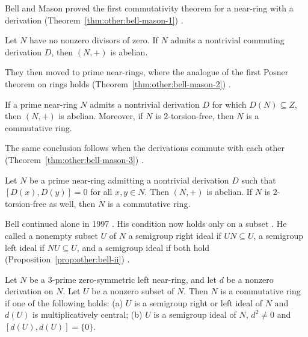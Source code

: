 Bell and Mason proved the first commutativity theorem for a near-ring with
a derivation (Theorem~\ref{thm:other:bell-mason-1}) \cite[Theorem~1, p.~32]{BellMason1987}.

\begin{theorem}\label{thm:other:bell-mason-1}
Let $N$ have no nonzero divisors of zero. If $N$ admits a nontrivial
commuting derivation $D$, then $(N, +)$ is abelian.
\end{theorem}

They then moved to prime near-rings, where the analogue of the first
Posner theorem on rings holds (Theorem~\ref{thm:other:bell-mason-2}) \cite[Theorem~2, p.~33]{BellMason1987}.

\begin{theorem}\label{thm:other:bell-mason-2}
If a prime near-ring $N$ admits a nontrivial derivation $D$ for which
$D(N) \subseteq Z$, then $(N, +)$ is abelian. Moreover, if $N$ is
$2$-torsion-free, then $N$ is a commutative ring.
\end{theorem}

The same conclusion follows when the derivations commute with each other (Theorem~\ref{thm:other:bell-mason-3})
\cite[Theorem~3, p.~33]{BellMason1987}.\begin{theorem}\label{thm:other:bell-mason-3}
Let $N$ be a prime near-ring admitting a nontrivial derivation $D$ such
that $[D(x), D(y)] = 0$ for all $x, y \in N$. Then $(N, +)$ is abelian.
If $N$ is $2$-torsion-free as well, then $N$ is a commutative ring.
\end{theorem}

Bell continued alone in 1997 \cite[p.~191]{Bell1997II}. His condition now
holds only on a subset \cite[p.~191]{Bell1997II}. He called a nonempty
subset $U$ of $N$ a semigroup
right ideal if $U N \subseteq U$, a semigroup left ideal if $N U \subseteq U$,
and a semigroup ideal if both hold (Proposition~\ref{prop:other:bell-ii}) \cite[p.~191]{Bell1997II}.

\begin{proposition}\label{prop:other:bell-ii}
Let $N$ be a $3$-prime zero-symmetric left near-ring, and let $d$ be a
nonzero derivation on $N$. Let $U$ be a nonzero subset of $N$. Then $N$ is
a commutative ring if one of the following holds: \textup{(a)} $U$ is a
semigroup right or left ideal of $N$ and $d(U)$ is multiplicatively
central; \textup{(b)} $U$ is a semigroup ideal of $N$, $d^{2} \neq 0$ and
$[d(U), d(U)] = \{0\}$.
\end{proposition}

